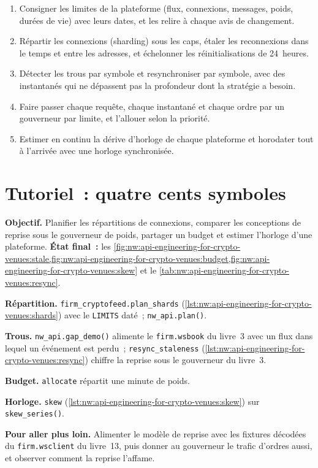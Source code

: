 \begin{method}\label{met:nw:api-engineering-for-crypto-venues:run}
\begin{enumerate}
\item Consigner les limites de la plateforme (flux, connexions, messages, poids, durées de vie) avec leurs dates, et les relire à chaque avis de changement.
\item Répartir les connexions (sharding) sous les caps, étaler les reconnexions dans le temps et entre les adresses, et échelonner les réinitialisations de 24~heures.
\item Détecter les trous par symbole et resynchroniser par symbole, avec des instantanés qui ne dépassent pas la profondeur dont la stratégie a besoin.
\item Faire passer chaque requête, chaque instantané et chaque ordre par un gouverneur par limite, et l'allouer selon la priorité.
\item Estimer en continu la dérive d'horloge de chaque plateforme et horodater tout à l'arrivée avec une horloge synchronisée.
\end{enumerate}
\end{method}

\section{Tutoriel~: quatre cents symboles}\label{tut:nw:api-engineering-for-crypto-venues:tut}

\begin{tutorial}
\textbf{Objectif.} Planifier les répartitions de connexions, comparer les conceptions de reprise sous le gouverneur de poids, partager un budget et estimer l'horloge d'une plateforme.
\textbf{État final~:} les \cref{fig:nw:api-engineering-for-crypto-venues:stale,fig:nw:api-engineering-for-crypto-venues:budget,fig:nw:api-engineering-for-crypto-venues:skew}
et le \cref{tab:nw:api-engineering-for-crypto-venues:resync}.
\begin{tutsteps}
\item \textbf{Répartition.} \texttt{firm\_cryptofeed.plan\_shards} (\cref{lst:nw:api-engineering-for-crypto-venues:shards}) avec le
  \texttt{LIMITS} daté~; \texttt{nw\_api.plan()}.
\item \textbf{Trous.} \texttt{nw\_api.gap\_demo()} alimente le \texttt{firm.wsbook} du livre~3 avec un flux dans lequel un événement est perdu~; \texttt{resync\_staleness}
  (\cref{lst:nw:api-engineering-for-crypto-venues:resync}) chiffre la reprise sous le gouverneur du livre~3.
\item \textbf{Budget.} \texttt{allocate} répartit une minute de poids.
\item \textbf{Horloge.} \texttt{skew} (\cref{lst:nw:api-engineering-for-crypto-venues:skew}) sur \texttt{skew\_series()}.
\end{tutsteps}
\textbf{Pour aller plus loin.} Alimenter le modèle de reprise avec les fixtures décodées du \texttt{firm.wsclient} du livre~13, puis donner au gouverneur le trafic
d'ordres aussi, et observer comment la reprise l'affame.
\end{tutorial}

